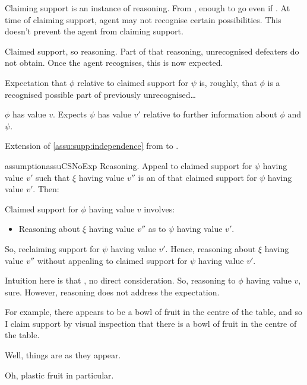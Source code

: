 \begin{note}
  Claiming support is an instance of reasoning.
  From \eiS{}, enough to go even if \mom{}.
  At time of claiming support, agent may not recognise certain possibilities.
  This doesn't prevent the agent from claiming support.

  Claimed support, so reasoning.
  Part of that reasoning, unrecognised defeaters do not obtain.
  Once the agent recognises, this is now expected.

  Expectation that \(\phi\) relative to claimed support for \(\psi\) is, roughly, that \(\phi\) is a recognised possible part of previously unrecognised\dots
\end{note}

\begin{note}
  \(\phi\) has value \(v\).
  Expects \(\psi\) has value \(v'\) relative to further information about \(\phi\) and \(\psi\).

  Extension of \autoref{assu:supp:independence} from  to .
\end{note}

\begin{note}
  \begin{restatable}{assumption}{assuCSNoExp}\label{assu:independence-expec}
    Reasoning.
    Appeal to claimed support for \(\psi\) having value \(v'\) such that \(\xi\) having value \(v''\) is an \expec{} of that claimed support for \(\psi\) having value \(v'\).
    Then:

    Claimed support for \(\phi\) having value \(v\) involves:
    \begin{itemize}
    \item Reasoning about \(\xi\) having value \(v''\) as \expec{} to \(\psi\) having value \(v'\).
    \end{itemize}
  \end{restatable}
  So, reclaiming support for \(\psi\) having value \(v'\).
  Hence, reasoning about \(\xi\) having value \(v''\) without appealing to claimed support for \(\psi\) having value \(v'\).
\end{note}

\begin{note}
  Intuition here is that \expec{}, no direct consideration.
  So, reasoning to \(\phi\) having value \(v\), sure.
  However, reasoning does not address the expectation.
\end{note}

\begin{note}
  For example, there appears to be a bowl of fruit in the centre of the table, and so I claim support by visual inspection that there is a bowl of fruit in the centre of the table.

  Well, things are as they appear.

  Oh, plastic fruit in particular.
\end{note}

